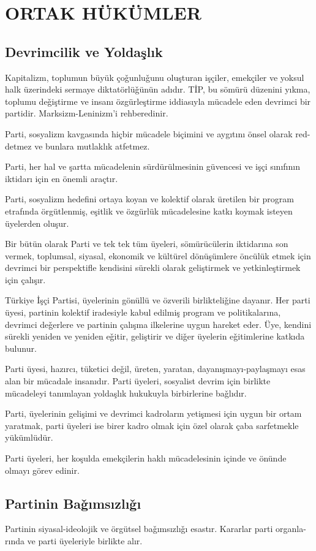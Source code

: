 \documentclass[11pt]{article} %
\begin{document}
\section{ORTAK HÜKÜMLER}


\subsection{Devrimcilik ve Yoldaşlık}
Kapitalizm, toplumun büyük çoǧunluǧunu oluşturan işçiler, emekçiler ve yoksul halk üzerindeki sermaye diktatörlüǧünün adıdır. TİP, bu sömürü düzenini yıkma, toplumu deǧiştirme ve insanı özgürleştirme iddiasıyla mücadele eden devrimci bir partidir. Marksizm-Leninizm’i rehberedinir.

Parti, sosyalizm kavgasında hiçbir mücadele biçimini ve aygıtını önsel olarak red-
detmez ve bunlara mutlaklık atfetmez.

Parti, her hal ve şartta mücadelenin sürdürülmesinin güvencesi ve işçi sınıfının iktidarı için en önemli araçtır.

Parti, sosyalizm hedefini ortaya koyan ve kolektif olarak üretilen bir program etrafında örgütlenmiş, eşitlik ve özgürlük mücadelesine katkı koymak isteyen üyelerden oluşur.

Bir bütün olarak Parti ve tek tek tüm üyeleri, sömürücülerin iktidarına son vermek, toplumsal, siyasal, ekonomik ve kültürel dönüşümlere öncülük etmek için devrimci bir perspektifle kendisini sürekli olarak geliştirmek ve yetkinleştirmek için çalışır.

Türkiye İşçi Partisi, üyelerinin gönüllü ve özverili birlikteliǧine dayanır. Her parti üyesi, partinin kolektif iradesiyle kabul edilmiş program ve politikalarına, devrimci deǧerlere ve partinin çalışma ilkelerine uygun hareket eder. Üye, kendini sürekli yeniden ve yeniden eǧitir, geliştirir ve diǧer üyelerin eǧitimlerine katkıda bulunur.

Parti üyesi, hazırcı, tüketici deǧil, üreten, yaratan, dayanışmayı-paylaşmayı esas alan bir mücadale insanıdır. Parti üyeleri, sosyalist devrim için birlikte mücadeleyi tanımlayan yoldaşlık hukukuyla birbirlerine baǧlıdır.

Parti, üyelerinin gelişimi ve devrimci kadroların yetişmesi için uygun bir ortam yaratmak, parti üyeleri ise birer kadro olmak için özel olarak çaba sarfetmekle yükümlüdür.

Parti üyeleri, her koşulda emekçilerin haklı mücadelesinin içinde ve önünde olmayı görev edinir.
\subsection{Partinin Baǧımsızlıǧı}
Partinin siyasal-ideolojik ve örgütsel baǧımsızlıǧı esastır. Kararlar parti organla-
rında ve parti üyeleriyle birlikte alır.
\end{document}
